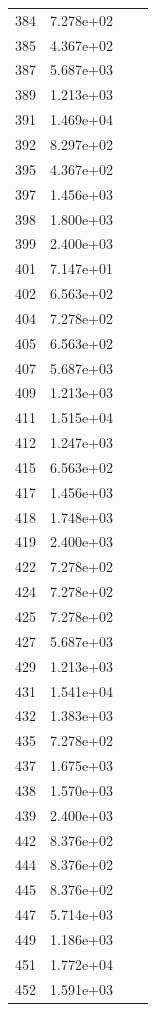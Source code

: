 \documentclass[12pt]{article}
\begin{document}
\begin{longtable}{@{}cccc@{}}
384 & 7.278e+02 &  &  \\
385 & 4.367e+02 &  &  \\
387 & 5.687e+03 &  &  \\
389 & 1.213e+03 &  &  \\
391 & 1.469e+04 &  &  \\
392 & 8.297e+02 &  &  \\
395 & 4.367e+02 &  &  \\
397 & 1.456e+03 &  &  \\
398 & 1.800e+03 &  &  \\
399 & 2.400e+03 &  &  \\
401 & 7.147e+01 &  &  \\
402 & 6.563e+02 &  &  \\
404 & 7.278e+02 &  &  \\
405 & 6.563e+02 &  &  \\
407 & 5.687e+03 &  &  \\
409 & 1.213e+03 &  &  \\
411 & 1.515e+04 &  &  \\
412 & 1.247e+03 &  &  \\
415 & 6.563e+02 &  &  \\
417 & 1.456e+03 &  &  \\
418 & 1.748e+03 &  &  \\
419 & 2.400e+03 &  &  \\
422 & 7.278e+02 &  &  \\
424 & 7.278e+02 &  &  \\
425 & 7.278e+02 &  &  \\
427 & 5.687e+03 &  &  \\
429 & 1.213e+03 &  &  \\
431 & 1.541e+04 &  &  \\
432 & 1.383e+03 &  &  \\
435 & 7.278e+02 &  &  \\
437 & 1.675e+03 &  &  \\
438 & 1.570e+03 &  &  \\
439 & 2.400e+03 &  &  \\
442 & 8.376e+02 &  &  \\
444 & 8.376e+02 &  &  \\
445 & 8.376e+02 &  &  \\
447 & 5.714e+03 &  &  \\
449 & 1.186e+03 &  &  \\
451 & 1.772e+04 &  &  \\
452 & 1.591e+03 &  &  \\

\end{longtable}
\end{document}
